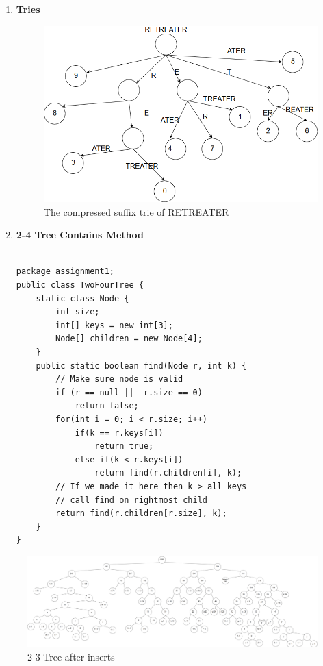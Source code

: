 \documentclass{article}
\begin{document}
\begin{enumerate}
  \item \textbf{Tries}
    \begin{figure}[H]
 	  \centering
 	  \caption{The compressed suffix trie of RETREATER}
 	  \label{Trees:CompressedSuffixTrie}
	  \includegraphics[width=\textwidth]{CompressedSuffixTrie}
    \end{figure}
  
  \item \textbf{2-4 Tree Contains Method}

  \begin{lstlisting}
  
package assignment1;
public class TwoFourTree {
    static class Node {
        int size;
        int[] keys = new int[3];
        Node[] children = new Node[4];
    }
    public static boolean find(Node r, int k) {
        // Make sure node is valid
        if (r == null ||  r.size == 0)
            return false;
        for(int i = 0; i < r.size; i++)
            if(k == r.keys[i])
                return true;
            else if(k < r.keys[i])
                return find(r.children[i], k);
        // If we made it here then k > all keys 
        // call find on rightmost child
        return find(r.children[r.size], k);
    }
}
 \end{lstlisting}
  
  
\end{enumerate}


\begin{figure}
  \centering
  \caption{2-3 Tree after inserts}
  \label{Trees:2-3Tree}
  \includegraphics[width=\paperwidth]{Huffman}
\end{figure}
\end{document}
